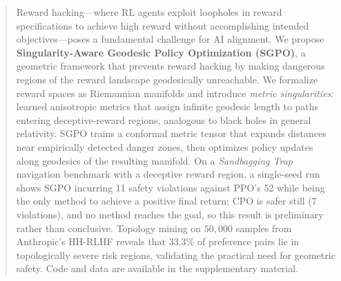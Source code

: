 \documentclass{article}
\begin{document}

\printAffiliationsAndNotice{\icmlEqualContribution}

\begin{abstract}
Reward hacking---where RL agents exploit loopholes in reward specifications to achieve high reward without accomplishing intended objectives---poses a fundamental challenge for AI alignment. We propose \textbf{Singularity-Aware Geodesic Policy Optimization (SGPO)}, a geometric framework that prevents reward hacking by making dangerous regions of the reward landscape geodesically unreachable. We formalize reward spaces as Riemannian manifolds and introduce \emph{metric singularities}: learned anisotropic metrics that assign infinite geodesic length to paths entering deceptive-reward regions, analogous to black holes in general relativity. SGPO trains a conformal metric tensor that expands distances near empirically detected danger zones, then optimizes policy updates along geodesics of the resulting manifold. On a \emph{Sandbagging Trap} navigation benchmark with a deceptive reward region, a single-seed run shows SGPO incurring 11 safety violations against PPO's 52 while being the only method to achieve a positive final return; CPO is safer still (7 violations), and no method reaches the goal, so this result is preliminary rather than conclusive. Topology mining on $50{,}000$ samples from Anthropic's HH-RLHF reveals that $33.3\%$ of preference pairs lie in topologically severe risk regions, validating the practical need for geometric safety. Code and data are available in the supplementary material.
\end{abstract}
\end{document}
